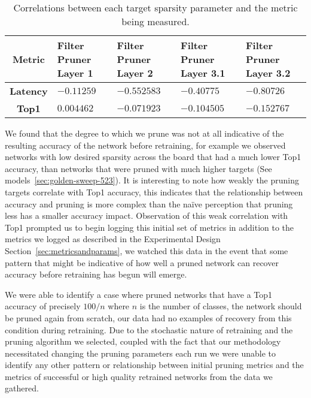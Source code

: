 \documentclass[../Dissertation.tex]{subfiles}
\begin{document}
\singlespacing
\begin{table}[H]
    \centering
    \begin{tabular}{@{}cp{26mm}p{26mm}p{26mm}p{26mm}@{}}
    \toprule
    \textbf{Metric}  & \textbf{Filter Pruner  Layer 1} & \textbf{Filter Pruner Layer 2} & \textbf{Filter Pruner Layer 3.1} & \textbf{Filter Pruner Layer 3.2} \\ \midrule
    \textbf{Latency} & $-0.11259$                        & $-0.552583$                      & $-0.40775$                         & $-0.80726$                         \\
    \textbf{Top1}    & $0.004462$                        & $-0.071923$                      & $-0.104505$                        & $-0.152767$                        \\ \bottomrule
    \end{tabular}
    \caption{Correlations between each target sparsity parameter and the metric being measured.}
    \label{tab:fastPruneCorrelations}
\end{table}
\doublespacing

We found that the degree to which we prune was not at all indicative of the resulting accuracy of the network before retraining, for example we observed networks with low desired sparsity across the board that had a much lower Top1 accuracy, than networks that were pruned with much higher targets (See models~\ref{sec:golden-sweep-523}).
It is interesting to note how weakly the pruning targets correlate with Top1 accuracy, this indicates that the relationship between accuracy and pruning is more complex than the naïve perception that pruning less has a smaller accuracy impact.
Observation of this weak correlation with Top1 prompted us to begin logging this initial set of metrics in addition to the metrics we logged as described in the Experimental Design Section~\ref{sec:metricsandparams}, we watched this data in the event that some pattern that might be indicative of how well a pruned network can recover accuracy before retraining has begun will emerge.

We were able to identify a case where pruned networks that have a Top1 accuracy of precisely $100 / n$ where $n$ is the number of classes, the network should be pruned again from scratch, our data had no examples of recovery from this condition during retraining.
Due to the stochastic nature of retraining and the pruning algorithm we selected, coupled with the fact that our methodology necessitated changing the pruning parameters each run we were unable to identify any other pattern or relationship between initial pruning metrics and the metrics of successful or high quality retrained networks from the data we gathered. 
\end{document}
